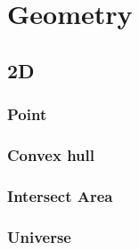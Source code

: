 \section{Geometry}
\subsection{2D}
\subsubsection{Point}

\subsubsection{Convex hull}

\subsubsection{Intersect Area}

\subsubsection{Universe}

